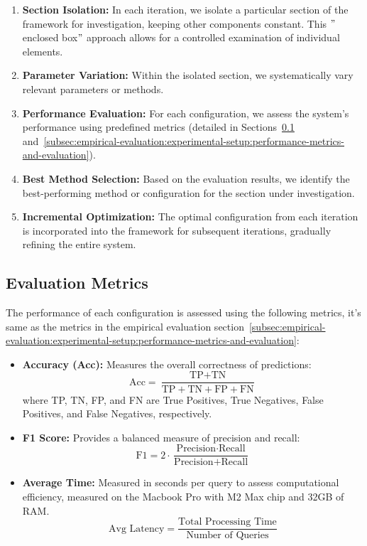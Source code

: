 \begin{enumerate}
    \item \textbf{Section Isolation:} In each iteration, we isolate a particular section of the framework for investigation, keeping other components constant.
    This \("\)enclosed box\("\) approach allows for a controlled examination of individual elements.
    \item \textbf{Parameter Variation:} Within the isolated section, we systematically vary relevant parameters or methods.
    \item \textbf{Performance Evaluation:} For each configuration, we assess the system's performance using predefined metrics (detailed in Sections~\ref{subsec:ablation-metrics} and~\ref{subsec:empirical-evaluation:experimental-setup:performance-metrics-and-evaluation}).
    \item \textbf{Best Method Selection:} Based on the evaluation results, we identify the best-performing method or configuration for the section under investigation.
    \item \textbf{Incremental Optimization:} The optimal configuration from each iteration is incorporated into the framework for subsequent iterations, gradually refining the entire system.
\end{enumerate}

\subsection{Evaluation Metrics}\label{subsec:ablation-metrics}
The performance of each configuration is assessed using the following metrics, it's same as the metrics in the empirical evaluation section~\ref{subsec:empirical-evaluation:experimental-setup:performance-metrics-and-evaluation}:

\begin{itemize}
    \item \textbf{Accuracy (Acc):} Measures the overall correctness of predictions:
    \begin{equation}
        \text{Acc} = \frac{\text{TP} + \text{TN}}{\text{TP} + \text{TN} + \text{FP} + \text{FN}}
    \end{equation}
    where TP, TN, FP, and FN are True Positives, True Negatives, False Positives, and False Negatives, respectively.
    \item \textbf{F1 Score:} Provides a balanced measure of precision and recall:
    \begin{equation}
        \text{F1} = 2 \cdot \frac{\text{Precision} \cdot \text{Recall}}{\text{Precision} + \text{Recall}}
    \end{equation}
    \item \textbf{Average Time:} Measured in seconds per query to assess computational efficiency, measured on the Macbook Pro with M2 Max chip and 32GB of RAM\@.
    \begin{equation}
        \text{Avg Latency} = \frac{\text{Total Processing Time}}{\text{Number of Queries}}
    \end{equation}
\end{itemize}

